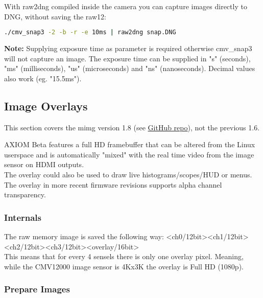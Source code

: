 With raw2dng compiled inside the camera you can capture images directly to DNG, without saving the raw12: 


\begin{lstlisting}[language=bash,morekeywords=$,keywordstyle=\bfseries,frame=none,xleftmargin=.25in,belowskip=2em, aboveskip=2em]
./cmv_snap3 -2 -b -r -e 10ms | raw2dng snap.DNG
\end{lstlisting} 


\textbf{Note:} Supplying exposure time as parameter is required otherwise cmv\_snap3 will not capture an image. The exposure time can be supplied in "s" (seconds), "ms" (milliseconds), "us" (microseconds) and "ns" (nanoseconds). Decimal values also work (eg. "15.5ms"). 


\subsection{Image Overlays}

This section covers the mimg version 1.8 (see \href{https://github.com/apertus-open-source-cinema/beta-software/tree/master/mimg}{GitHub repo}), not the previous 1.6. 

AXIOM Beta features a full HD framebuffer that can be altered from the Linux userspace and is automatically "mixed" with the real time video from the image sensor on HDMI outputs.\\

The overlay could also be used to draw live histograms/scopes/HUD or menus.\\

The overlay in more recent firmware revisions supports alpha channel transparency. \\


\subsubsection{Internals}


The raw memory image is saved the following way: <ch0/12bit><ch1/12bit><ch2/12bit><ch3/12bit><overlay/16bit> \\

This means that for every 4 sensels there is only one overlay pixel. Meaning, while the CMV12000 image sensor is 4Kx3K the overlay is Full HD (1080p). 


\subsubsection{Prepare Images}

